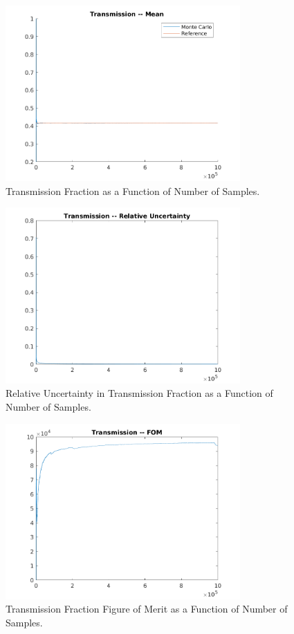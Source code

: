 \documentclass{article}
\begin{document}
  \begin{figure}
    \centering
    \includegraphics[width=0.8\textwidth]{transmission_mean}
    \caption{Transmission Fraction as a Function of Number of Samples.}
    \label{fig:transmission_mean}
  \end{figure}
  \begin{figure}
    \centering
    \includegraphics[width=0.8\textwidth]{transmission_reluncertainty}
    \caption{Relative Uncertainty in Transmission Fraction as a Function of Number 
      of Samples.}
    \label{fig:transmission_reluncertainty}
  \end{figure}
  \begin{figure}
    \centering
    \includegraphics[width=0.8\textwidth]{transmission_fom}
    \caption{Transmission Fraction Figure of Merit as a Function of Number of 
      Samples.}
    \label{fig:transmission_fom}
  \end{figure}
\end{document}
